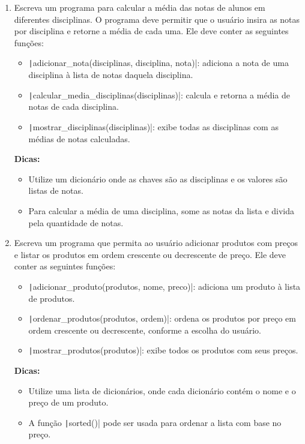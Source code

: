 \documentclass[12pt]{article}
\begin{document}
\begin{enumerate}
  \item Escreva um programa para calcular a média das notas de alunos em diferentes disciplinas. O programa deve permitir que o usuário insira as notas por disciplina e retorne a média de cada uma. Ele deve conter as seguintes funções:
    \begin{itemize}
      \item \texttt|adicionar_nota(disciplinas, disciplina, nota)|: adiciona a nota de uma disciplina à lista de notas daquela disciplina.
      \item \texttt|calcular_media_disciplinas(disciplinas)|: calcula e retorna a média de notas de cada disciplina.
      \item \texttt|mostrar_disciplinas(disciplinas)|: exibe todas as disciplinas com as médias de notas calculadas.
    \end{itemize}
    \textbf{Dicas:}
    \begin{itemize}
      \item Utilize um dicionário onde as chaves são as disciplinas e os valores são listas de notas.
      \item Para calcular a média de uma disciplina, some as notas da lista e divida pela quantidade de notas.
    \end{itemize}

  \item Escreva um programa que permita ao usuário adicionar produtos com preços e listar os produtos em ordem crescente ou decrescente de preço. Ele deve conter as seguintes funções:
    \begin{itemize}
      \item \texttt|adicionar_produto(produtos, nome, preco)|: adiciona um produto à lista de produtos.
      \item \texttt|ordenar_produtos(produtos, ordem)|: ordena os produtos por preço em ordem crescente ou decrescente, conforme a escolha do usuário.
      \item \texttt|mostrar_produtos(produtos)|: exibe todos os produtos com seus preços.
    \end{itemize}
    \textbf{Dicas:}
    \begin{itemize}
      \item Utilize uma lista de dicionários, onde cada dicionário contém o nome e o preço de um produto.
      \item A função \texttt|sorted()| pode ser usada para ordenar a lista com base no preço.
    \end{itemize}


\end{enumerate}
\end{document}
